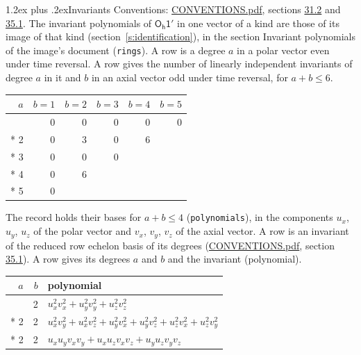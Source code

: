 \documentclass[10pt,a4paper]{article}
\makeatletter
\renewcommand\section{\@startsection{section}{1}{\z@}{-3ex plus -1ex minus -.2ex}%
  {1.2ex plus .2ex}{\normalfont\large\sffamily\bfseries\color{parttitle}}}
\numberwithin{equation}{section}
\newcommand{\grp}[1]{\mathsf{#1}}
\makeatother
\begin{document}
\section{Invariants}\label{s:invariants}
Conventions: \href{../../CONVENTIONS.pdf}{CONVENTIONS.pdf}, sections \href{../../CONVENTIONS.pdf\#conv.31.2}{31.2} and \href{../../CONVENTIONS.pdf\#conv.35.1}{35.1}.
The invariant polynomials of $\grp{O_{h}1'}$ in one vector of a kind are those of its image of that kind (section~\ref{s:identification}), in the section Invariant polynomials of the image's document (\texttt{rings}).
\leavevmode\label{n:index.degree.polar}\label{n:index.degree.axial}A row is a degree $a$ in a polar vector even under time reversal. A row gives the number of linearly independent invariants of degree $a$ in it and $b$ in an axial vector odd under time reversal, for $a + b \le 6$.
{\small\begin{longtable}{@{}rrrrrr@{}}\toprule
$a$ & $b = 1$ & $b = 2$ & $b = 3$ & $b = 4$ & $b = 5$\\\midrule\endhead
\bottomrule\endfoot\endlastfoot
1 & 0 & 0 & 0 & 0 & 0\\*
2 & 0 & 3 & 0 & 6 & \\*
3 & 0 & 0 & 0 &  & \\*
4 & 0 & 6 &  &  & \\*
5 & 0 &  &  &  & \\
\bottomrule\end{longtable}}
\leavevmode\label{n:local.component.polar}\label{n:local.component.axial}The record holds their bases for $a + b \le 4$ (\texttt{polynomials}), in the components $u_{x}$, $u_{y}$, $u_{z}$ of the polar vector and $v_{x}$, $v_{y}$, $v_{z}$ of the axial vector. \label{n:head.polynomial}A row is an invariant of the reduced row echelon basis of its degrees (\href{../../CONVENTIONS.pdf}{CONVENTIONS.pdf}, section \href{../../CONVENTIONS.pdf\#conv.35.1}{35.1}). A row gives its degrees $a$ and $b$ and the invariant (polynomial).
{\small\renewcommand{\arraystretch}{1.2}\begin{longtable}{@{}rrl@{}}\toprule
$a$ & $b$ & polynomial\\\midrule\endhead
\bottomrule\endfoot\endlastfoot
2 & 2 & $u_{x}^{2}v_{x}^{2} + u_{y}^{2}v_{y}^{2} + u_{z}^{2}v_{z}^{2}$\\*
2 & 2 & $u_{x}^{2}v_{y}^{2} + u_{x}^{2}v_{z}^{2} + u_{y}^{2}v_{x}^{2} + u_{y}^{2}v_{z}^{2} + u_{z}^{2}v_{x}^{2} + u_{z}^{2}v_{y}^{2}$\\*
2 & 2 & $u_{x}u_{y}v_{x}v_{y} + u_{x}u_{z}v_{x}v_{z} + u_{y}u_{z}v_{y}v_{z}$\\
\bottomrule\end{longtable}}
\end{document}
